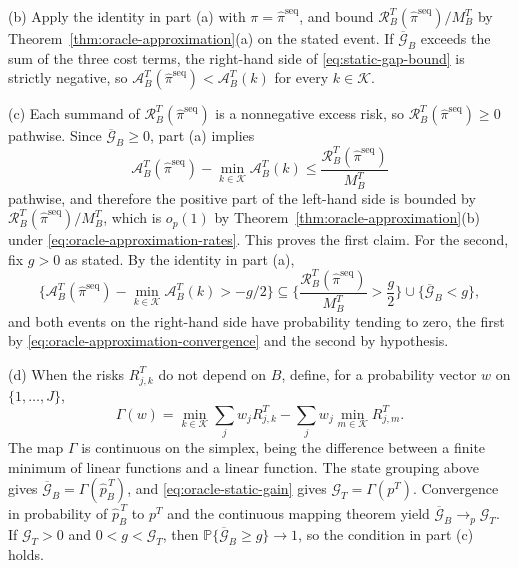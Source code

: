 \documentclass[a4paper, 12pt]{article}
\theoremstyle{plain}
\theoremstyle{remark}
\newcommand{\Prb}{\mathbb{P}}
\newcommand{\Kcal}{\mathcal{K}}
\newcommand{\1}{\mathbf{1}}
\begin{document}
(b) Apply the identity in part (a) with \(\pi=\widehat\pi^{\mathrm{seq}}\), and bound \(\mathcal R^T_B(\widehat\pi^{\mathrm{seq}})/M^T_B\) by Theorem~\ref{thm:oracle-approximation}(a) on the stated event. If \(\overline{\mathcal G}_B\) exceeds the sum of the three cost terms, the right-hand side of \eqref{eq:static-gap-bound} is strictly negative, so \(\mathcal A^T_B(\widehat\pi^{\mathrm{seq}})<\mathcal A^T_B(k)\) for every \(k\in\Kcal\).

(c) Each summand of \(\mathcal R^T_B(\widehat\pi^{\mathrm{seq}})\) is a nonnegative excess risk, so \(\mathcal R^T_B(\widehat\pi^{\mathrm{seq}})\geq 0\) pathwise. Since \(\overline{\mathcal G}_B\geq 0\), part (a) implies
\begin{equation*}
\mathcal A^T_B(\widehat\pi^{\mathrm{seq}})-\min_{k\in\Kcal}\mathcal A^T_B(k)
\leq\frac{\mathcal R^T_B(\widehat\pi^{\mathrm{seq}})}{M^T_B}
\end{equation*}
pathwise, and therefore the positive part of the left-hand side is bounded by \(\mathcal R^T_B(\widehat\pi^{\mathrm{seq}})/M^T_B\), which is \(o_p(1)\) by Theorem~\ref{thm:oracle-approximation}(b) under \eqref{eq:oracle-approximation-rates}. This proves the first claim. For the second, fix \(g>0\) as stated. By the identity in part (a),
\begin{equation*}
\Big\{\mathcal A^T_B(\widehat\pi^{\mathrm{seq}})-\min_{k\in\Kcal}\mathcal A^T_B(k)>-g/2\Big\}
\subseteq
\Big\{\frac{\mathcal R^T_B(\widehat\pi^{\mathrm{seq}})}{M^T_B}>\frac{g}{2}\Big\}
\cup
\Big\{\overline{\mathcal G}_B<g\Big\},
\end{equation*}
and both events on the right-hand side have probability tending to zero, the first by \eqref{eq:oracle-approximation-convergence} and the second by hypothesis.

(d) When the risks \(R^T_{j,k}\) do not depend on \(B\), define, for a probability vector \(w\) on \(\{1,\ldots,J\}\),
\begin{equation*}
\Gamma(w)=\min_{k\in\Kcal}\sum_{j}w_j R^T_{j,k}-\sum_{j}w_j\min_{m\in\Kcal}R^T_{j,m}.
\end{equation*}
The map \(\Gamma\) is continuous on the simplex, being the difference between a finite minimum of linear functions and a linear function. The state grouping above gives \(\overline{\mathcal G}_B=\Gamma(\widehat p^{\,T}_B)\), and \eqref{eq:oracle-static-gain} gives \(\mathcal G_T=\Gamma(p^T)\). Convergence in probability of \(\widehat p^{\,T}_B\) to \(p^T\) and the continuous mapping theorem yield \(\overline{\mathcal G}_B\to_p\mathcal G_T\). If \(\mathcal G_T>0\) and \(0<g<\mathcal G_T\), then \(\Prb\{\overline{\mathcal G}_B\geq g\}\to 1\), so the condition in part (c) holds.
\end{document}
